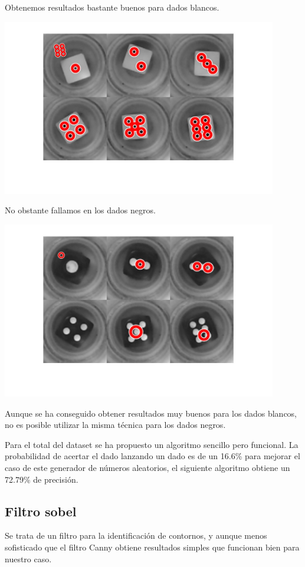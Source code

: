 Obtenemos resultados bastante buenos para dados blancos.

\begin{center}
    \includegraphics[width=0.9\textwidth]{ImagenesLatex/dices_circles.jpg}
\end{center}

No obstante fallamos en los dados negros.

\begin{center}
    \includegraphics[width=0.9\textwidth]{ImagenesLatex/black_dice.jpg}
\end{center}

Aunque se ha conseguido obtener resultados muy buenos para los dados blancos, no es posible utilizar la misma técnica para los dados negros.

Para el total del dataset se ha propuesto un algoritmo sencillo pero funcional. La probabilidad de acertar el dado lanzando un dado es de un 16.6\% para mejorar el caso de este generador de números aleatorios, el siguiente algoritmo obtiene un 72.79\% de precisión.

\subsection{Filtro sobel}
Se trata de un filtro para la identificación de contornos, y aunque menos sofisticado que el filtro Canny obtiene resultados simples que funcionan bien para nuestro caso.

